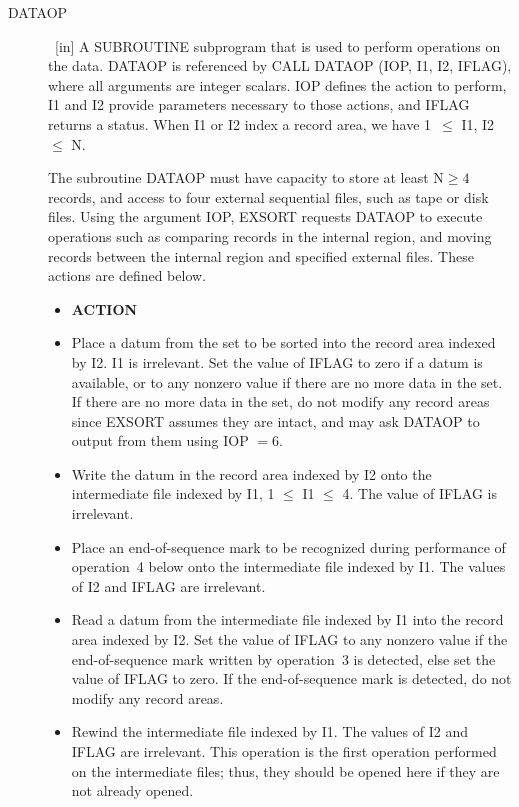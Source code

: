 \documentclass[twoside]{MATH77}
\begin{document}
\begin{description}

\item[DATAOP] \ [in] A SUBROUTINE subprogram that is used to perform operations on
the data. DATAOP is referenced by CALL DATAOP (IOP, I1, I2, IFLAG), where
all arguments are integer scalars. IOP defines the action to perform, I1 and
I2 provide parameters necessary to those actions, and IFLAG returns a
status. When I1 or I2 index a record area, we have 1\ $\leq $ I1,
I2 $\leq $ N.

The subroutine DATAOP must have capacity to store at least $\text{N} \geq 4$
records, and access to four external
sequential files, such as tape or disk files. Using the argument IOP, EXSORT
requests DATAOP to execute operations such as comparing records in the
internal region, and moving records between the internal region and
specified external files. These actions are defined below.
\begin{itemize}
\item[\bf IOP] {\hspace{.5in} \bf ACTION}

\item[1\ ] Place a datum from the set to be sorted into the record area indexed by
I2. I1 is irrelevant. Set the value of IFLAG to zero if a datum is
available, or to any nonzero value if there are no more data in the set. If
there are no more data in the set, do not modify any record areas
since EXSORT assumes they are intact, and may ask DATAOP to output from them
using IOP $= 6.$

\item[2\ ] Write the datum in the record area indexed by I2 onto the intermediate
file indexed by I1, 1 $\leq $ I1 $\leq $ 4. The value of
IFLAG is irrelevant.

\item[3\ ] Place an end-of-sequence mark to be recognized during performance of
operation~4 below onto the intermediate file indexed by I1. The values of I2
and IFLAG are irrelevant.

\item[4\ ] Read a datum from the intermediate file indexed by I1 into the record area
indexed by I2. Set the value of IFLAG to any nonzero value if the
end-of-sequence mark written by operation~3 is detected, else set the value
of IFLAG to zero.  If the end-of-sequence mark is detected, do not
modify any record areas.

\item[5\ ] Rewind the intermediate file indexed by I1. The values of I2 and IFLAG are
irrelevant. This operation is the first operation performed on the
intermediate files; thus, they should be opened here if they are not already
opened.


\end{itemize}
\end{description}
\end{document}
